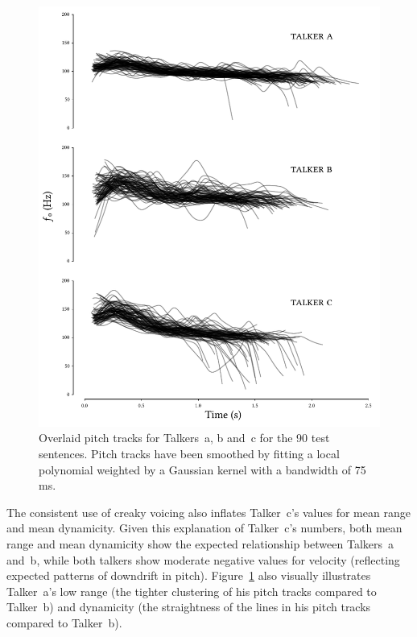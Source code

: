 \begin{figure}[ptb]
	\begin{centering}
	\includegraphics{figures/posthocs/PitchTracks.pdf}
	\caption[Pitch track overlays of the test sentences]{Overlaid pitch tracks for Talkers~\ac{a}, \ac{b} and~\ac{c} for the 90 test sentences.  Pitch tracks have been smoothed by fitting a local polynomial weighted by a Gaussian kernel with a bandwidth of 75 ms.\label{fig:PitchTracks}}
	\end{centering}
\end{figure}

The consistent use of creaky voicing also inflates Talker~\ac{c}’s values for mean \fo{} range and mean \fo{} dynamicity.  Given this explanation of Talker~\ac{c}’s numbers, both mean \fo{} range and mean \fo{} dynamicity show the expected relationship between Talkers~\ac{a} and~\ac{b}, while both talkers show moderate negative values for \fo{} velocity (reflecting expected patterns of downdrift in pitch).  Figure~\ref{fig:PitchTracks} also visually illustrates Talker~\ac{a}’s low \fo{} range (the tighter clustering of his pitch tracks compared to Talker~\ac{b}) and dynamicity (the straightness of the lines in his pitch tracks compared to Talker~\ac{b}).

